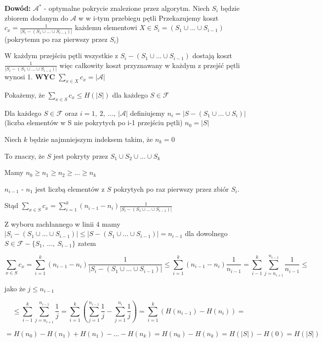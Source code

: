 \textbf{Dowód: }$\mathcal{A}^{\ast}$ - optymalne pokrycie znalezione przez algorytm. Niech $S_i$ będzie zbiorem dodanym do $\mathcal{A}$ w w i-tym przebiegu pętli
Przekazujemy koszt $c_x=\frac{1}{\vert S_i-(S_1\cup ... \cup S_{i-1})\vert}$ każdemu elementowi $X\in S_i = (S_1 \cup ... \cup S_{i-1})$ (pokrytemu po raz pierwszy przez $S_i$)

\tab W każdym przejściu pętli wszystkie z $S_i - (S_1 \cup ... \cup S_{i-1})$ dostają koszt $\frac{1}{\vert S_i-(S_1\cup ... \cup S_{i-1})\vert}$ więc całkowity koszt przyznawany w każdym z przejść pętli wynosi 1.
\textbf{WYC} $\sum_{x\in X}c_x=\vert \mathcal{A}\vert$

Pokażemy, że $\sum_{x\in S}c_x \leq H(\vert S\vert)$ dla każdego $S\in \mathcal{F}$

Dla każdego $S\in \mathcal{F}$ oraz $i=1,\ 2,\ ...,\ \vert\mathcal{A}\vert$ definiujemy $n_i = \vert S - (S_1 \cup ... \cup S_i)\vert$ (liczba elementów w S nie pokrytych po i-1 przejściu pętli)
\tab $n_0=\vert S\vert$


Niech $k$ będzie najmniejszym indeksem takim, że $n_k=0$ 

To znaczy, że $S$ jest pokryty przez $S_1 \cup S_2 \cup ... \cup S_k$

Mamy $n_0\geq n_1\geq n_2\geq ...\geq n_k$ 

$n_{i-1}$ - $n_1$ jest liczbą elementów z $S$ pokrytych po raz pierwszy przez zbiór $S_i$.

Stąd $\sum_{x\in S}c_x = \sum_{i=1}^{k}(n_{i-1}-n_i)\frac{1}{\vert S_i - (S_1 \cup ... \cup S_{i-1})\vert}$

Z wyboru zachłannego w linii 4 mamy $\vert S_i - (S_1 \cup ... \cup S_{i-1})\vert \leq \vert S - (S_1 \cup ... \cup S_{i-1})\vert = n_{i-1}$ dla dowolnego $S \in \mathcal{F} - \lbrace S_1,\ ...,\ S_{i-1}\rbrace$ zatem

$$\sum_{x\in S} c_x = \sum_{i=1}^{k} (n_{i-1}-n_i)\frac{1}{\vert S_i - (S_1 \cup ... \cup S_{i-1})\vert} \leq \sum_{i=1}^{k}(n_{i-1}- n_i)\frac{1}{n_{i-1}}=\sum_{i-1}^{k}\sum_{j=n_{i+1}}^{n_{i-1}}\frac{1}{n_{i-1}} \leq$$

jako że $j\leq n_{i-1}$

$$\leq \sum_{i-1}^{k}\sum_{j=n_{i+1}}^{n_{i-1}}\frac{1}{j}=\sum_{i=1}^{k}(\sum_{j=1}^{n_{i-1}} \frac{1}{j}- \sum_{j=1}^{n_i} \frac{1}{j}) = \sum_{i=1}^{k} (H(n_{i-1}) - H(n_i)) = $$

$$ = H(n_0) - H(n_1) + H(n_1) - ... - H(n_k) = H(n_0) - H(n_k) = H(\vert S\vert ) - H(0) = H(\vert S\vert )$$


